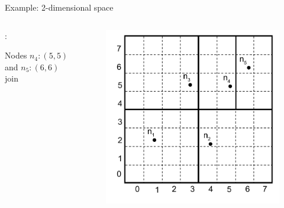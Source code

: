 \begin{frame}{Example: 2-dimensional space}

\begin{columns}
\begin{column}{0.5\textwidth}
:\\
\BI
\item Nodes $n_4:(5, 5)$ and $n_5:(6,6)$ join
\EI
\end{column}
\begin{column}{0.5\textwidth}
\begin{figure}
	\includegraphics[width=1.0\textwidth]{can4}
\end{figure}
\end{column}
\end{columns}
		
\end{frame}	


